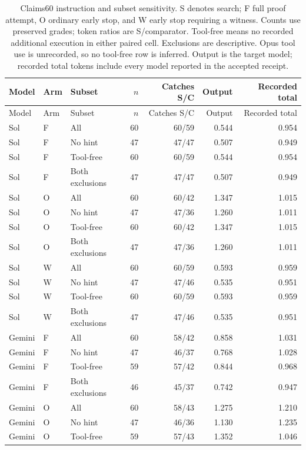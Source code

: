 \begin{longtable}{lllrrrr}
\caption{Claims60 instruction and subset sensitivity. S denotes search; F full proof attempt, O ordinary early stop, and W early stop requiring a witness. Counts use preserved grades; token ratios are S/comparator. Tool-free means no recorded additional execution in either paired cell. Exclusions are descriptive. Opus tool use is unrecorded, so no tool-free row is inferred. Output is the target model; recorded total tokens include every model reported in the accepted receipt.}\label{tab:claims60-all-sensitivities}\\
\toprule Model & Arm & Subset & $n$ & Catches S/C & Output & Recorded total \\
\midrule\endfirsthead
\toprule Model & Arm & Subset & $n$ & Catches S/C & Output & Recorded total \\
\midrule\endhead
Sol & F & All & 60 & 60/59 & 0.544 & 0.954 \\
Sol & F & No hint & 47 & 47/47 & 0.507 & 0.949 \\
Sol & F & Tool-free & 60 & 60/59 & 0.544 & 0.954 \\
Sol & F & Both exclusions & 47 & 47/47 & 0.507 & 0.949 \\
Sol & O & All & 60 & 60/42 & 1.347 & 1.015 \\
Sol & O & No hint & 47 & 47/36 & 1.260 & 1.011 \\
Sol & O & Tool-free & 60 & 60/42 & 1.347 & 1.015 \\
Sol & O & Both exclusions & 47 & 47/36 & 1.260 & 1.011 \\
Sol & W & All & 60 & 60/59 & 0.593 & 0.959 \\
Sol & W & No hint & 47 & 47/46 & 0.535 & 0.951 \\
Sol & W & Tool-free & 60 & 60/59 & 0.593 & 0.959 \\
Sol & W & Both exclusions & 47 & 47/46 & 0.535 & 0.951 \\
Gemini & F & All & 60 & 58/42 & 0.858 & 1.031 \\
Gemini & F & No hint & 47 & 46/37 & 0.768 & 1.028 \\
Gemini & F & Tool-free & 59 & 57/42 & 0.844 & 0.968 \\
Gemini & F & Both exclusions & 46 & 45/37 & 0.742 & 0.947 \\
Gemini & O & All & 60 & 58/43 & 1.275 & 1.210 \\
Gemini & O & No hint & 47 & 46/36 & 1.130 & 1.235 \\
Gemini & O & Tool-free & 59 & 57/43 & 1.352 & 1.046 \\

\end{longtable}
